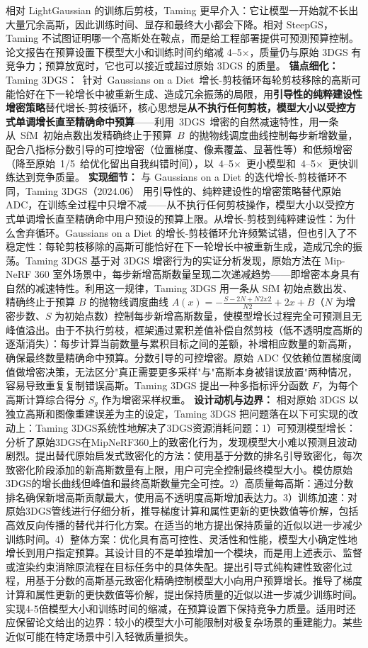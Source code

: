 相对 LightGaussian 的训练后剪枝，Taming 更早介入：它让模型一开始就不长出大量冗余高斯，因此训练时间、显存和最终大小都会下降。相对 SteepGS，Taming 不试图证明哪一个高斯处在鞍点，而是给工程部署提供可预测预算控制。论文报告在预算设置下模型大小和训练时间约缩减 4--5$\times$，质量仍与原始 3DGS 有竞争力；预算放宽时，它也可以接近或超过原始 3DGS 的质量。
\textbf{锚点细化：} Taming 3DGS：~针对~Gaussians on a Diet~增长-剪枝循环每轮剪枝移除的高斯可能恰好在下一轮增长中被重新生成、造成冗余振荡的局限，用\textbf{引导性的纯粹建设性增密策略}替代增长-剪枝循环，核心思想是\textbf{从不执行任何剪枝，模型大小以受控方式单调增长直至精确命中预算}——利用~3DGS~增密的自然减速特性，用一条从~SfM~初始点数出发精确终止于预算~$B$~的抛物线调度曲线控制每步新增数量，配合八指标分数引导的可控增密（位置梯度、像素覆盖、显著性等）和低频增密（降至原始~1/5~给优化留出自我纠错时间），以~4--5$\times$~更小模型和~4--5$\times$~更快训练达到竞争质量。
\textbf{实现细节：} 与 Gaussians on a Diet 的迭代增长-剪枝循环不同，Taming 3DGS（2024.06） 用引导性的、纯粹建设性的增密策略替代原始 ADC，在训练全过程中只增不减——从不执行任何剪枝操作，模型大小以受控方式单调增长直至精确命中用户预设的预算上限。从增长-剪枝到纯粹建设性：为什么舍弃循环。Gaussians on a Diet 的增长-剪枝循环允许频繁试错，但也引入了不稳定性：每轮剪枝移除的高斯可能恰好在下一轮增长中被重新生成，造成冗余的振荡。Taming 3DGS 基于对 3DGS 增密行为的实证分析发现，原始方法在 Mip-NeRF 360 室外场景中，每步新增高斯数量呈现二次递减趋势——即增密本身具有自然的减速特性。利用这一规律，Taming 3DGS 用一条从 SfM 初始点数出发、精确终止于预算 $B$ 的抛物线调度曲线 $A(x) = -\frac{S-2N+N^{}2x^{}2}{N^{}2} + 2x + B$（$N$ 为增密步数、$S$ 为初始点数）控制每步新增高斯数量，使模型增长过程完全可预测且无峰值溢出。由于不执行剪枝，框架通过累积差值补偿自然剪枝（低不透明度高斯的逐渐消失）：每步计算当前数量与累积目标之间的差额，补增相应数量的新高斯，确保最终数量精确命中预算。分数引导的可控增密。原始 ADC 仅依赖位置梯度阈值做增密决策，无法区分"真正需要更多采样"与"高斯本身被错误放置"两种情况，容易导致重复复制错误高斯。Taming 3DGS 提出一种多指标评分函数 $F$，为每个高斯计算综合得分 $S_g$ 作为增密采样权重。
\textbf{设计动机与边界：} 相对原始 3DGS 以独立高斯和图像重建误差为主的设定，Taming 3DGS 把问题落在以下可实现的改动上：Taming 3DGS系统性地解决了3DGS资源消耗问题：1）可预测模型增长：分析了原始3DGS在MipNeRF360上的致密化行为，发现模型大小难以预测且波动剧烈。提出替代原始启发式致密化的方法：使用基于分数的排名引导致密化，每次致密化阶段添加的新高斯数量有上限，用户可完全控制最终模型大小。模仿原始3DGS的增长曲线但峰值和最终高斯数量完全可控。2）高质量每高斯：通过分数排名确保新增高斯贡献最大，使用高不透明度高斯增加表达力。3）训练加速：对原始3DGS管线进行仔细分析，推导梯度计算和属性更新的更快数值等价解，包括高效反向传播的替代并行化方案。在适当的地方提出保持质量的近似以进一步减少训练时间。4）整体方案：优化具有高可控性、灵活性和性能，模型大小确定性地增长到用户指定预算。其设计目的不是单独增加一个模块，而是用上述表示、监督或渲染约束消除原流程在目标任务中的具体失配。提出引导式纯构建性致密化过程，用基于分数的高斯基元致密化精确控制模型大小向用户预算增长。推导了梯度计算和属性更新的更快数值等价解，提出保持质量的近似以进一步减少训练时间。实现4-5倍模型大小和训练时间的缩减，在预算设置下保持竞争力质量。适用时还应保留论文给出的边界：较小的模型大小可能限制对极复杂场景的重建能力。某些近似可能在特定场景中引入轻微质量损失。
